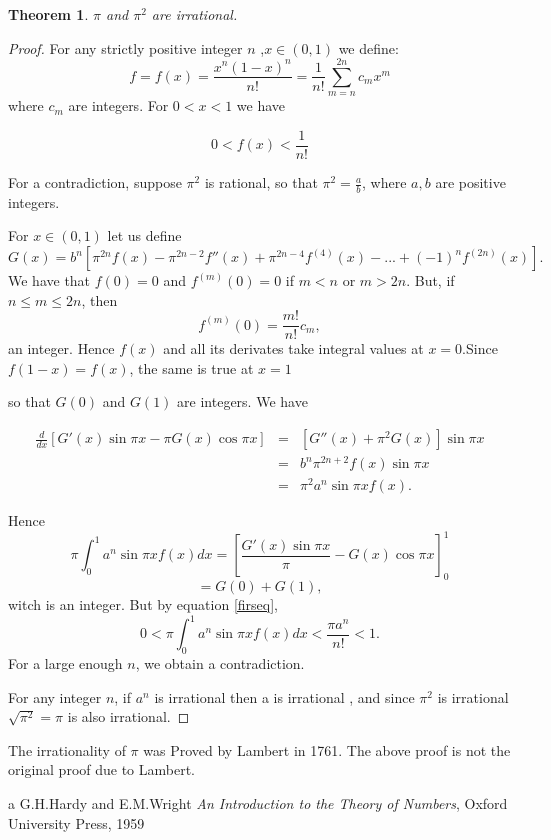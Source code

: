 \documentclass[12pt]{article}
\begin{document}
\newtheorem{thm}{Theorem}
\begin{thm}
$\pi$ and $\pi^2$ are irrational.
\end{thm}

\begin{proof}
For any strictly positive integer $n$ ,$x\in (0,1)$ we define:
$$f=f(x)=\frac{x^n(1-x)^n}{n!}=\frac{1}{n!}\sum_{m=n}^{2n}c_mx^m$$
where $c_m$ are integers. For $0<x<1$ we have

\begin{equation}
\label{firseq}
0<f(x)<\frac{1}{n!}
\end{equation}

For a contradiction, suppose $\pi^2$ is rational, so that $\pi^2=\frac{a}{b}$, where $a,b$ are positive integers.

For $x\in (0,1)$ let us define
$$G(x)=b^n[\pi^{2n}f(x)-\pi^{2n-2}f''(x)+\pi^{2n-4}f^{(4)}(x)-...+(-1)^nf^{(2n)}(x)].$$
We have that $f(0)=0$ and $f^{(m)}(0)=0$ if $m<n$ or $m>2n$. But, if $n \leq m \leq 2n$, then
$$f^{(m)}(0)=\frac{m!}{n!}c_m,$$
an integer. Hence $f(x)$ and all its derivates take integral values at $x=0$.Since $f(1-x)=f(x)$, the same is true at $x=1$

so that $G(0)$ and $G(1)$ are integers. We have

\begin{eqnarray*}
\frac{d}{dx}[G'(x)\sin{\pi x}-\pi G(x)\cos{\pi x}]
&=& [G''(x)+\pi^2G(x)]\sin{\pi x} \\
&=& b^n\pi^{2n+2}f(x)\sin{\pi x} \\
&=& \pi^2a^n \sin{\pi x}f(x).
\end{eqnarray*}

Hence
$$\pi\int_0^1a^n \sin{\pi x}f(x)dx=[\frac{G'(x)\sin{\pi x}}{\pi}-G(x)\cos{\pi x}]_0^1$$
$$=G(0)+G(1),$$
witch is an integer. But by equation \ref{firseq},
$$0<\pi\int_0^1a^n \sin{\pi x}f(x)dx<\frac{\pi a^n}{n!}<1.$$
For a large enough $n$, we obtain a contradiction.

For any integer $n$, if $a^n$ is irrational then a is irrational , 
and since $\pi^2$ is irrational $\sqrt{\pi^2}=\pi$ is also irrational.
\end{proof}

The irrationality of $\pi$ was Proved by Lambert in 1761. The above proof is not the original proof due to Lambert.
\begin{thebibliography}{99}
\bibitem a G.H.Hardy and E.M.Wright \emph{An Introduction to the Theory of
Numbers}, Oxford University Press, 1959
\end{thebibliography}
\end{document}
